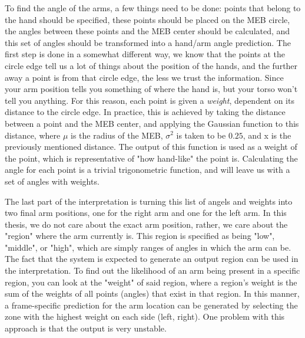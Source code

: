 To find the angle of the arms, a few things need to be done: points that belong to the hand should be specified, these points should be placed on the MEB circle, the angles between these points and the MEB center should be calculated, and this set of angles should be transformed into a hand/arm angle prediction.
The first step is done in a somewhat different way, we know that the points at the circle edge tell us a lot of things about the position of the hands, and the further away a point is from that circle edge, the less we trust the information. 
Since your arm position tells you something of where the hand is, but your torso won't tell you anything.
For this reason, each point is given a \textit{weight}, dependent on its distance to the circle edge.
In practice, this is achieved by taking the distance between a point and the MEB center, and applying the Gaussian function to this distance, where $\mu$ is the radius of the MEB, $\sigma^2$ is taken to be $0.25$, and x is the previously mentioned distance.
The output of this function is used as a weight of the point, which is representative of "how hand-like" the point is.
Calculating the angle for each point is a trivial trigonometric function, and will leave us with a set of angles with weights.

The last part of the interpretation is turning this list of angels and weights into two final arm positions, one for the right arm and one for the left arm.
In this thesis, we do not care about the exact arm position, rather, we care about the "region" where the arm currently is.
This region is specified as being "low", "middle", or "high", which are simply ranges of angles in which the arm can be.
The fact that the system is expected to generate an output region can be used in the interpretation.
To find out the likelihood of an arm being present in a specific region, you can look at the "weight" of said region, where a region's weight is the sum of the weights of all points (angles) that exist in that region.
In this manner, a frame-specific prediction for the arm location can be generated by selecting the zone with the highest weight on each side (left, right).
One problem with this approach is that the output is very unstable.

